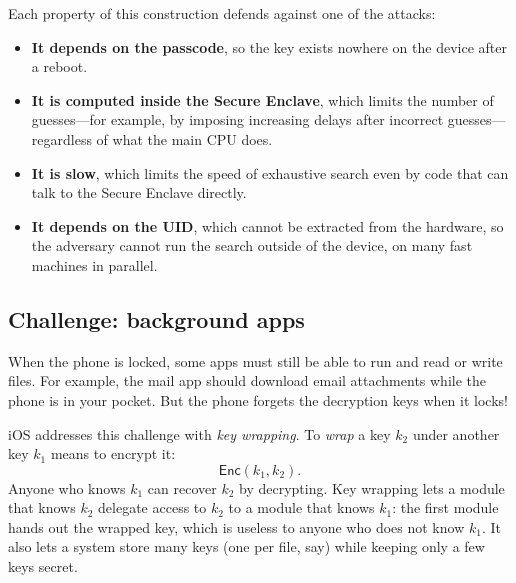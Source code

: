 \documentclass[
  letterpaper,
]{scrbook}
\providecommand{\tightlist}{%
  \setlength{\itemsep}{0pt}\setlength{\parskip}{0pt}}
\theoremstyle{definition}
\theoremstyle{plain}
\theoremstyle{plain}
\theoremstyle{remark}
\begin{document}

Each property of this construction defends against one of the attacks:

\begin{itemize}
\tightlist
\item
  \textbf{It depends on the passcode}, so the key exists nowhere on the
  device after a reboot.
\item
  \textbf{It is computed inside the Secure Enclave}, which limits the
  number of guesses---for example, by imposing increasing delays after
  incorrect guesses---regardless of what the main CPU does.
\item
  \textbf{It is slow}, which limits the speed of exhaustive search even
  by code that can talk to the Secure Enclave directly.
\item
  \textbf{It depends on the UID}, which cannot be extracted from the
  hardware, so the adversary cannot run the search outside of the
  device, on many fast machines in parallel.
\end{itemize}

\subsection{Challenge: background apps}\label{challenge-background-apps}

When the phone is locked, some apps must still be able to run and read
or write files. For example, the mail app should download email
attachments while the phone is in your pocket. But the phone forgets the
decryption keys when it locks!

iOS addresses this challenge with \emph{key wrapping}. To \emph{wrap} a
key \(k_2\) under another key \(k_1\) means to encrypt it: \[
  \mathsf{Enc}(k_1, k_2).
\] Anyone who knows \(k_1\) can recover \(k_2\) by decrypting. Key
wrapping lets a module that knows \(k_2\) delegate access to \(k_2\) to
a module that knows \(k_1\): the first module hands out the wrapped key,
which is useless to anyone who does not know \(k_1\). It also lets a
system store many keys (one per file, say) while keeping only a few keys
secret.
\end{document}
